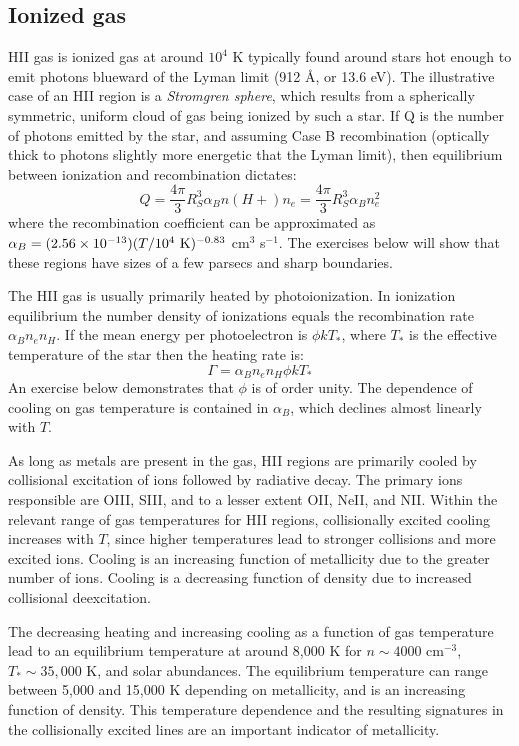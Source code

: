 \subsection{Ionized gas}

HII gas is ionized gas at around $10^4$ K typically found around stars
hot enough to emit photons blueward of the Lyman limit (912 \AA, or
13.6 eV). The illustrative case of an HII region is a {\it Stromgren
sphere}, which results from a spherically symmetric, uniform cloud of
gas being ionized by such a star. If Q is the number of photons
emitted by the star, and assuming Case B recombination (optically
thick to photons slightly more energetic that the Lyman limit), then
equilibrium between ionization and recombination dictates:
\begin{equation}
Q = \frac{4\pi}{3} R_{S}^3 \alpha_B n(H+) n_e = 
\frac{4\pi}{3} R_{S}^3 \alpha_B n_e^2 
\end{equation}
where the recombination coefficient can be approximated as $\alpha_B =
(2.56 \times 10^{-13}) (T/10^4 {\rm ~K})^{-0.83}$ cm$^3$ s$^{-1}$. The
exercises below will show that these regions have sizes of a few
parsecs and sharp boundaries.

The HII gas is usually primarily heated by photoionization. In
ionization equilibrium the number density of ionizations equals the
recombination rate $\alpha_B n_e n_H$. If the mean energy per
photoelectron is $\phi kT_\ast$, where $T_\ast$ is the effective
temperature of the star then the heating rate is:
\begin{equation}
\Gamma = \alpha_B n_e n_H \phi k T_\ast
\end{equation}
An exercise below demonstrates that $\phi$ is of order unity. The
dependence of cooling on gas temperature is contained in $\alpha_B$,
which declines almost linearly with $T$. 

As long as metals are present in the gas, HII regions are primarily
cooled by collisional excitation of ions followed by radiative
decay. The primary ions responsible are OIII, SIII, and to a lesser
extent OII, NeII, and NII. Within the relevant range of gas
temperatures for HII regions, collisionally excited cooling increases
with $T$, since higher temperatures lead to stronger collisions and
more excited ions. Cooling is an increasing function of metallicity
due to the greater number of ions. Cooling is a decreasing function of
density due to increased collisional deexcitation.

The decreasing heating and increasing cooling as a function of gas
temperature lead to an equilibrium temperature at around 8,000 K for
$n \sim 4000$ cm$^{-3}$, $T_\ast \sim 35,000$ K, and solar
abundances. The equilibrium temperature can range between 5,000 and
15,000 K depending on metallicity, and is an increasing function of
density. This temperature dependence and the resulting signatures in
the collisionally excited lines are an important indicator of
metallicity.

